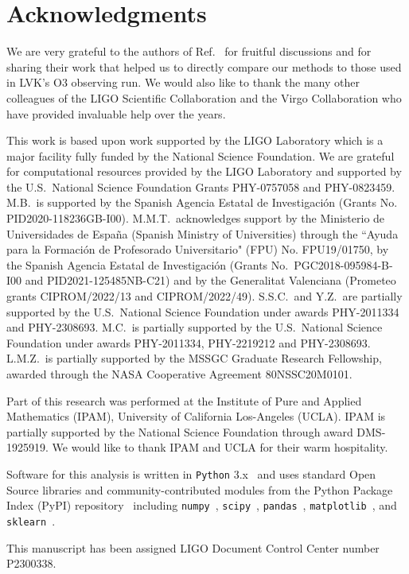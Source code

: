\section*{Acknowledgments}

We are very grateful to the authors of Ref.~\cite{Chatterjee:2019avs} for fruitful discussions and for sharing their work that helped us to directly compare
our methods to those used in \ac{LVK}'s \ac{O3} observing run. We would also like to thank the many other colleagues of the LIGO Scientific Collaboration and
the Virgo Collaboration who have provided invaluable help over the years.

This work is based upon work supported by the LIGO Laboratory which is a major facility fully funded by the National Science Foundation. We are grateful for computational resources provided
by the LIGO Laboratory and supported by the U.S.\ National Science Foundation Grants PHY-0757058 and PHY-0823459. M.B.\ is supported by the Spanish Agencia Estatal de Investigaci\'on (Grants
No. PID2020-118236GB-I00). M.M.T.\ acknowledges support by the Ministerio de Universidades de Espa\~na (Spanish Ministry of Universities) through the ``Ayuda para la Formaci\'on de
Profesorado Universitario" (FPU) No. FPU19/01750, by the Spanish Agencia Estatal de Investigaci\'on (Grants No.\ PGC2018-095984-B-I00 and PID2021-125485NB-C21) and by the Generalitat
Valenciana (Prometeo grants CIPROM/2022/13 and CIPROM/2022/49). S.S.C.\ and Y.Z.\ are partially supported by the U.S.\ National Science Foundation under awards PHY-2011334 and PHY-2308693.
M.C.\ is partially supported by the U.S.\ National Science Foundation under awards PHY-2011334, PHY-2219212 and PHY-2308693. L.M.Z.\ is partially supported by the MSSGC Graduate Research
Fellowship, awarded through the NASA Cooperative Agreement 80NSSC20M0101.

 Part of this research was performed at the Institute of Pure and Applied Mathematics (IPAM),  University of California Los-Angeles (UCLA). IPAM is partially supported by the National Science
Foundation through award DMS-1925919. We would like to thank IPAM and UCLA for their warm hospitality. 

Software for this analysis is written in \texttt{Python} 3.x~\cite{python3} and
uses standard Open Source libraries and community-contributed modules from the
Python Package Index (PyPI) repository~\cite{pypi} including
\texttt{numpy}~\cite{harris2020array}, \texttt{scipy}~\cite{2020SciPy-NMeth},
\texttt{pandas}~\cite{reback2020pandas,mckinney-proc-scipy-2010},
\texttt{matplotlib}~\cite{Hunter:2007ouj}, and \texttt{sklearn}~\cite{scikit-learn}.

This manuscript has been assigned LIGO Document Control Center number P2300338.





